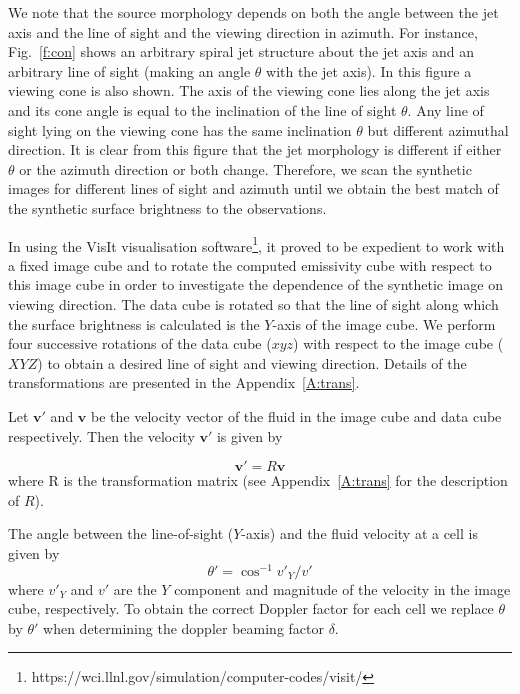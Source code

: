 \documentclass[useAMS, usenatbib]{mn2e}
\begin{document}
We note that the source morphology depends on both the angle between the jet axis and the line of sight and the viewing direction in azimuth. For instance, Fig.~\ref{f:con} shows an arbitrary spiral jet structure about the jet axis and an arbitrary line of sight (making an angle $\theta$ with the jet axis). In this figure a viewing cone is also shown. The axis of the viewing cone lies along the jet axis and its cone angle is equal to the inclination of the line of sight $\theta$. Any line of sight lying on the viewing cone has the same inclination $\theta$ but different azimuthal direction. It is clear from this figure that the jet morphology is different if either $\theta$ or the azimuth direction or both change. Therefore, we scan the synthetic images for different lines of sight and azimuth until we obtain the best match of the synthetic surface brightness to the observations. 

In using the VisIt visualisation software\footnote{https://wci.llnl.gov/simulation/computer-codes/visit/}, it proved to be expedient to work with a fixed image cube and to rotate the computed emissivity cube with respect to this image cube in order to investigate the dependence of the synthetic image on viewing direction. The data cube is rotated so that the line of sight along which the surface brightness is calculated is the $Y$-axis of the image cube. We perform four successive rotations of the data cube ($xyz$) with respect to the image cube ($XYZ$) to obtain a desired line of sight and viewing direction. Details of the transformations are presented in the Appendix~\ref{A:trans}. 

Let $\textbf{v}'$ and $\textbf{v}$ be the velocity vector of the fluid in the image cube and data cube respectively. Then the velocity $\textbf{v}'$ is given by 

\begin{equation}
\textbf{v}' = R \textbf{v}
\end{equation}
where R is the transformation matrix (see Appendix~\ref{A:trans} for the description of $R$).

The angle between the line-of-sight ($Y$-axis) and the fluid velocity at a cell is given by 
\begin{equation}
\theta' = \cos^{-1}v'_Y / v'
\end{equation}
where $v'_Y$ and $v'$ are the $Y$ component and magnitude of the velocity in the image cube, respectively. To obtain the correct Doppler factor for each cell we replace $\theta$ by $\theta'$ when determining the doppler beaming factor $\delta$.
\end{document}
